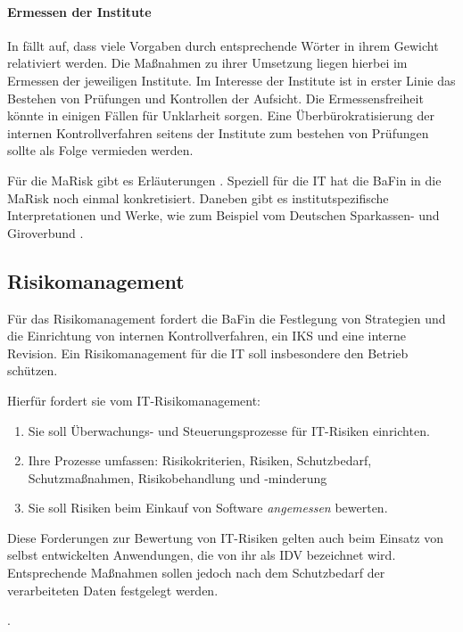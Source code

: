 \paragraph{Ermessen der Institute}
In \cite{MaRisk:2017, BAIT:2018} fällt auf, dass viele Vorgaben durch entsprechende Wörter in ihrem Gewicht relativiert werden. Die Maßnahmen zu ihrer Umsetzung liegen hierbei im Ermessen der jeweiligen Institute. Im Interesse der Institute ist in erster Linie das Bestehen von Prüfungen und Kontrollen der Aufsicht. Die Ermessensfreiheit könnte in einigen Fällen für Unklarheit sorgen. Eine Überbürokratisierung der internen Kontrollverfahren seitens der Institute zum bestehen von Prüfungen sollte als Folge vermieden werden. 

Für die \ac{MaRisk} gibt es Erläuterungen \cite{MaRiskErläuterungen:2017}. Speziell für die IT hat die BaFin in \cite{BAIT:2018} die \ac{MaRisk} noch einmal konkretisiert. Daneben gibt es institutspezifische Interpretationen und Werke, wie zum Beispiel vom Deutschen Sparkassen- und Giroverbund \cite{DSGV:2019}.
%

\subsection{Risikomanagement}
Für das Risikomanagement fordert die \ac{BaFin} die Festlegung von Strategien und die Einrichtung von internen Kontrollverfahren, ein \ac{IKS} und eine interne Revision. Ein Risikomanagement für die IT soll insbesondere den Betrieb schützen. \cite{MaRisk:2017}

Hierfür fordert sie vom IT-Risikomanagement:
\begin{enumerate}
    \item Sie soll Überwachungs- und Steuerungsprozesse für IT-Risiken einrichten.
    \item Ihre Prozesse umfassen: Risikokriterien, Risiken, Schutzbedarf, Schutzmaßnahmen, Risikobehandlung und -minderung
    \item Sie soll Risiken beim Einkauf von Software \emph{angemessen} bewerten.
\end{enumerate}
Diese Forderungen zur Bewertung von IT-Risiken gelten auch beim Einsatz von selbst entwickelten Anwendungen, die von ihr als \ac{IDV} bezeichnet wird. Entsprechende Maßnahmen sollen jedoch nach dem Schutzbedarf der verarbeiteten Daten festgelegt werden.

\cite{MaRisk:2017}.

